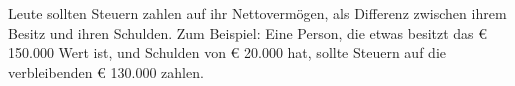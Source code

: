 Leute sollten Steuern zahlen auf ihr Nettovermögen, als Differenz zwischen ihrem Besitz und ihren Schulden.
Zum Beispiel: Eine Person, die etwas besitzt das € 150.000 Wert ist, und Schulden von € 20.000 hat, sollte Steuern auf die verbleibenden € 130.000 zahlen.